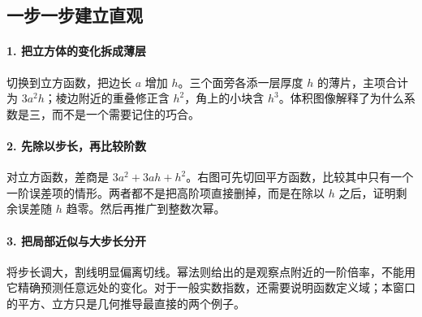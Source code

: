 \subsection*{一步一步建立直观}

\paragraph{1. 把立方体的变化拆成薄层}

切换到立方函数，把边长 $a$ 增加 $h$。三个面旁各添一层厚度 $h$ 的薄片，主项合计为 $3a^2h$；棱边附近的重叠修正含 $h^2$，角上的小块含 $h^3$。体积图像解释了为什么系数是三，而不是一个需要记住的巧合。



\paragraph{2. 先除以步长，再比较阶数}

对立方函数，差商是 $3a^2+3ah+h^2$。右图可先切回平方函数，比较其中只有一个一阶误差项的情形。两者都不是把高阶项直接删掉，而是在除以 $h$ 之后，证明剩余误差随 $h$ 趋零。然后再推广到整数次幂。



\paragraph{3. 把局部近似与大步长分开}

将步长调大，割线明显偏离切线。幂法则给出的是观察点附近的一阶倍率，不能用它精确预测任意远处的变化。对于一般实数指数，还需要说明函数定义域；本窗口的平方、立方只是几何推导最直接的两个例子。
